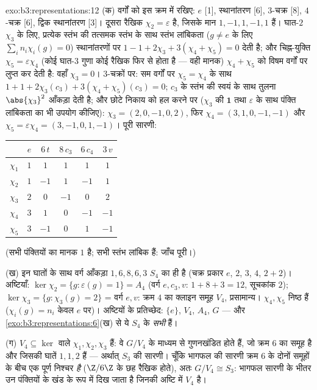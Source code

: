 \begin{solution}{exo:b3:representations:12}
(क) वर्गों को इस क्रम में रखिए: $e$ [1], स्थानांतरण [6],
$3$-चक्र [8], $4$-चक्र [6], द्विक स्थानांतरण [3]। दूसरा रैखिक
 $\chi_2 = \varepsilon$ है, जिसके मान $1, -1, 1, -1, 1$ हैं। घात-$2$  $\chi_3$ के लिए,
प्रत्येक स्तंभ की तत्समक स्तंभ के साथ स्तंभ लांबिकता ($g \neq e$ के लिए
$\sum_in_i\chi_i(g) = 0$) स्थानांतरणों पर $1 - 1 + 2\chi_3 + 3(\chi_4 +
\chi_5) = 0$ देती है; और चिह्न-युक्ति $\chi_5 = \varepsilon\chi_4$ (कोई
घात-$3$  गुणा कोई रैखिक  फिर से  होता है --- वही
मानक) $\chi_4 + \chi_5$ को विषम वर्गों पर लुप्त कर देती है: वहाँ $\chi_3 = 0$। $3$-चक्रों
पर: सम वर्गों पर $\chi_5 = \chi_4$ के साथ $1 + 1 +
2\chi_3(c_3) + 3(\chi_4 + \chi_5)(c_3) = 0$; $c_3$ के स्तंभ की स्वयं के साथ
तुलना $\abs{\chi_3}^2$ आँकड़ा देती है; और छोटे निकाय को हल करने पर ($\chi_3$ की
$\mathbf 1$ तथा $\varepsilon$ के साथ पंक्ति लांबिकता का भी उपयोग कीजिए): $\chi_3 = (2, 0, -1, 0, 2)$,
फिर $\chi_4 =
(3, 1, 0, -1, -1)$ और $\chi_5 = \varepsilon\chi_4 = (3, -1,
0, 1, -1)$। पूरी सारणी:
\begin{center}
\begin{tabular}{c|ccccc}
 & $e$ & $6\,t$ & $8\,c_3$ & $6\,c_4$ & $3\,v$\\
\hline
$\chi_1$ & $1$ & $1$ & $1$ & $1$ & $1$\\
$\chi_2$ & $1$ & $-1$ & $1$ & $-1$ & $1$\\
$\chi_3$ & $2$ & $0$ & $-1$ & $0$ & $2$\\
$\chi_4$ & $3$ & $1$ & $0$ & $-1$ & $-1$\\
$\chi_5$ & $3$ & $-1$ & $0$ & $1$ & $-1$\\
\end{tabular}
\end{center}
(सभी पंक्तियों का मानक $1$ है; सभी स्तंभ लांबिक हैं: जाँच पूरी।)

(ख) इन घातों के साथ वर्ग आँकड़ा $1, 6, 8, 6, 3$ $S_4$ का ही है (चक्र प्रकार
$e$, $2$, $3$, $4$, $2{+}2$)। अष्टियाँ: $\ker\chi_2 = \{g : \varepsilon(g) = 1\} = A_4$ (वर्ग $e, c_3, v$:
$1 + 8 + 3 = 12$, सूचकांक $2$); $\ker\chi_3 = \{g : \chi_3(g) = 2\}$ = वर्ग $e, v$: क्रम $4$ का क्लाइन
समूह $V_4$, प्रसामान्य। $\chi_4, \chi_5$ निष्ठ हैं ($\chi_i(g) = n_i$ केवल $e$ पर)।
अष्टियों के प्रतिच्छेद: $\{e\}$, $V_4$, $A_4$, $G$ --- और \cref{exo:b3:representations:6}(ख)
से ये $S_4$ के \emph{सभी}  हैं।

(ग) $V_4 \subseteq \ker$ वाले  $\chi_1,
\chi_2, \chi_3$ हैं: वे $G/V_4$ के माध्यम से गुणनखंडित होते
हैं, जो क्रम $6$ का समूह है और जिसकी  घातें $1, 1, 2$ हैं ---
अर्थात् $S_3$ की सारणी। चूँकि भागफल की सारणी क्रम $6$ के दोनों
समूहों के बीच एक पूर्ण निश्चर \emph{है} ($\Z/6\Z$ के छह रैखिक 
होते), अतः $G/V_4 \cong
S_3$: भागफल सारणी के भीतर उन पंक्तियों के खंड के रूप
में दिख जाता है जिनकी अष्टि में $V_4$ है।
\end{solution}

